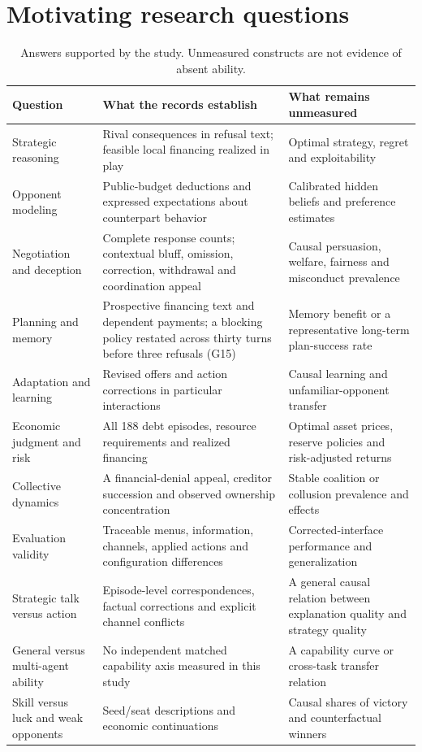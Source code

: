 \section{Motivating research questions}
\label{app:questions}
\begin{longtable}{@{}L{.24\linewidth}L{.39\linewidth}L{.31\linewidth}@{}}
\caption{Answers supported by the study. Unmeasured constructs are not evidence of absent ability.}\\
\toprule Question & What the records establish & What remains unmeasured\\\midrule\endhead
Strategic reasoning & Rival consequences in refusal text; feasible local financing realized in play & Optimal strategy, regret and exploitability\\
Opponent modeling & Public-budget deductions and expressed expectations about counterpart behavior & Calibrated hidden beliefs and preference estimates\\
Negotiation and deception & Complete response counts; contextual bluff, omission, correction, withdrawal and coordination appeal & Causal persuasion, welfare, fairness and misconduct prevalence\\
Planning and memory & Prospective financing text and dependent payments; a blocking policy restated across thirty turns before three refusals (G15) & Memory benefit or a representative long-term plan-success rate\\
Adaptation and learning & Revised offers and action corrections in particular interactions & Causal learning and unfamiliar-opponent transfer\\
Economic judgment and risk & All 188 debt episodes, resource requirements and realized financing & Optimal asset prices, reserve policies and risk-adjusted returns\\
Collective dynamics & A financial-denial appeal, creditor succession and observed ownership concentration & Stable coalition or collusion prevalence and effects\\
Evaluation validity & Traceable menus, information, channels, applied actions and configuration differences & Corrected-interface performance and generalization\\\midrule
Strategic talk versus action & Episode-level correspondences, factual corrections and explicit channel conflicts & A general causal relation between explanation quality and strategy quality\\
General versus multi-agent ability & No independent matched capability axis measured in this study & A capability curve or cross-task transfer relation\\
Skill versus luck and weak opponents & Seed/seat descriptions and economic continuations & Causal shares of victory and counterfactual winners\\\bottomrule
\end{longtable}

